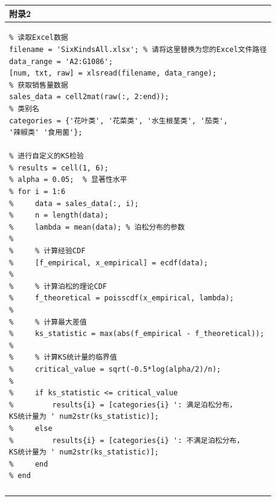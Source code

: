 \documentclass{my_paper}
\begin{document}
\begin{table}[H]
    \centering
    \begin{tabular}{|p{14.0cm}|}
    \hline
    \textbf{附录2} \\ 
    \hline
\begin{lstlisting}
% 读取Excel数据
filename = 'SixKindsAll.xlsx'; % 请将这里替换为您的Excel文件路径
data_range = 'A2:G1086';
[num, txt, raw] = xlsread(filename, data_range);
% 获取销售量数据
sales_data = cell2mat(raw(:, 2:end));
% 类别名
categories = {'花叶类', '花菜类', '水生根茎类', '茄类',
'辣椒类' '食用菌'};

% 进行自定义的KS检验
% results = cell(1, 6);
% alpha = 0.05;  % 显著性水平
% for i = 1:6
%     data = sales_data(:, i);
%     n = length(data);
%     lambda = mean(data); % 泊松分布的参数
% 
%     % 计算经验CDF
%     [f_empirical, x_empirical] = ecdf(data);
%     
%     % 计算泊松的理论CDF
%     f_theoretical = poisscdf(x_empirical, lambda);
%     
%     % 计算最大差值
%     ks_statistic = max(abs(f_empirical - f_theoretical));
%     
%     % 计算KS统计量的临界值
%     critical_value = sqrt(-0.5*log(alpha/2)/n);
% 
%     if ks_statistic <= critical_value
%         results{i} = [categories{i} ': 满足泊松分布，
KS统计量为 ' num2str(ks_statistic)];
%     else
%         results{i} = [categories{i} ': 不满足泊松分布，
KS统计量为 ' num2str(ks_statistic)];
%     end
% end
\end{lstlisting}
    \\
    \\
\hline
    \end{tabular}
\end{table}\newpage
\end{document}
